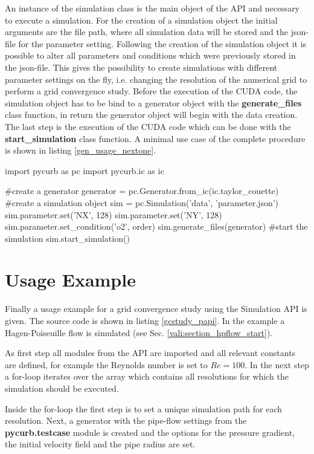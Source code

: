 An instance of the simulation class is the main object of the API and
necessary to execute a simulation. For the creation of a simulation object
the initial arguments are the file path, where all simulation data will be stored
and the json-file for the parameter setting.
Following the creation of the simulation object it is possible to alter all parameters and conditions
which were previously stored in the json-file. This gives the possibility to create
simulations with different parameter settings on the fly, i.e. changing the resolution of the numerical grid
to perform a grid convergence study.
Before the execution of the CUDA code, the simulation object has to be bind to a generator object
with the \textbf{generate\_files} class function, in return the generator object will begin
with the data creation. The last step is the execution of the CUDA code which can be done with the \textbf{start\_simulation}
class function.  A minimal use case of the complete procedure is shown in listing \ref{gen_usage_nextone}.

\clearpage

\begin{python}[caption='Simulation class usage', label={gen_usage_nextone}]
import pycurb as pc
import pycurb.ic as ic

#create a generator
generator = pc.Generator.from_ic(ic.taylor_couette)
#create a simulation object
sim = pc.Simulation('data', 'parameter.json')
sim.parameter.set('NX', 128)
sim.parameter.set('NY', 128)
sim.parameter.set_condition('o2', order)
sim.generate_files(generator)
#start the simulation
sim.start_simulation()
\end{python}

\section{Usage Example}

Finally a usage example for a grid convergence study using the Simulation API is given.
The source code is shown in listing \ref{gcstudy_papi}.
In the example  a Hagen-Poiseuille flow is simulated (see Sec. \ref{vali:section_hpflow_start}).

As first step all modules from the API are imported and all relevant constants are defined, for example the
Reynolds number is set to  $Re=100$.
In the next step a  for-loop iterates over the  array which contains all resolutions for which the
simulation should be executed.

Inside the for-loop the first step is to set a unique simulation path for each resolution.
Next, a generator with the pipe-flow settings from the \textbf{pycurb.testcase} module is created
and the options for the pressure gradient, the initial velocity field and the pipe radius are set.

